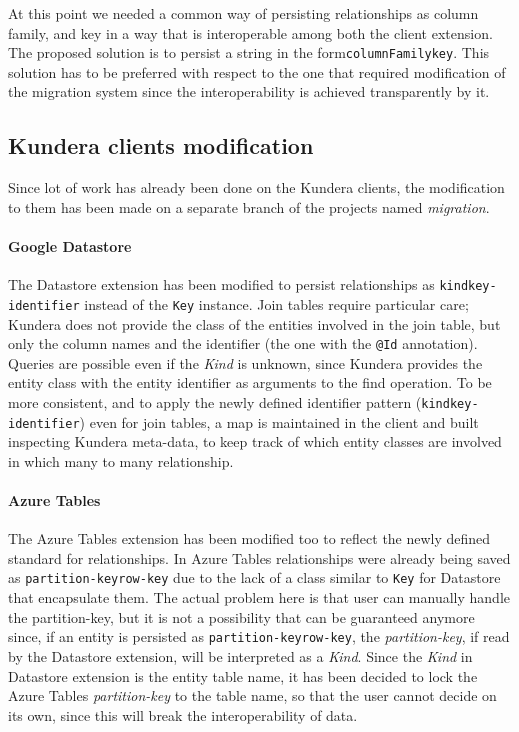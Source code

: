 \noindent At this point we needed a common way of persisting relationships as column family, and key in a way that is interoperable among both the client extension.
The proposed solution is to persist a string in the form\texttt{columnFamily\textunderscore key}. This solution has to be preferred with respect to the one that required modification of the migration system since the interoperability is achieved transparently by it.

\subsection{Kundera clients modification}
Since lot of work has already been done on the Kundera clients, the modification to them has been made on a separate branch of the projects named \textit{migration}.

\paragraph{Google Datastore} The Datastore extension has been modified to persist relationships as \texttt{kind\textunderscore key-identifier} instead of the \texttt{Key} instance.
Join tables require particular care; Kundera does not provide the class of the entities involved in the join table, but only the column names and the identifier (the one with the \texttt{@Id} annotation). Queries are possible even if the \textit{Kind} is unknown, since Kundera provides the entity class with the entity identifier as arguments to the find operation.
To be more consistent, and to apply the newly defined identifier pattern (\texttt{kind\textunderscore key-identifier}) even for join tables, a map is maintained in the client and built inspecting Kundera meta-data, to keep track of which entity classes are involved in which many to many relationship.

\paragraph{Azure Tables} The Azure Tables extension has been modified too to reflect the newly defined standard for relationships. In Azure Tables relationships were already being saved as \texttt{partition-key\textunderscore row-key} due to the lack of a class similar to \texttt{Key} for Datastore that encapsulate them. The actual problem here is that user can manually handle the partition-key, but it is not a possibility that can be guaranteed anymore since, if an entity is persisted as \texttt{partition-key\textunderscore row-key}, the \textit{partition-key}, if read by the Datastore extension, will be interpreted as a \textit{Kind}.
Since the \textit{Kind} in Datastore extension is the entity table name, it has been decided to lock the Azure Tables \textit{partition-key} to the table name, so that the user cannot decide on its own, since this will break the interoperability of data.

